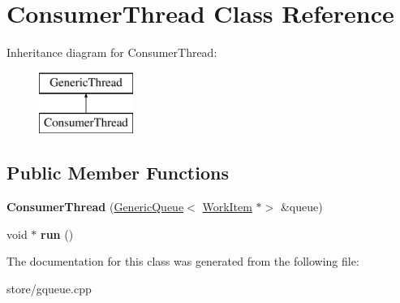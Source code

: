 \hypertarget{classConsumerThread}{}\section{Consumer\+Thread Class Reference}
\label{classConsumerThread}
Inheritance diagram for Consumer\+Thread\+:\begin{figure}[H]
\begin{center}
\leavevmode
\includegraphics[height=2.000000cm]{classConsumerThread}
\end{center}
\end{figure}
\subsection*{Public Member Functions}
\begin{DoxyCompactItemize}
\item 
{\bfseries Consumer\+Thread} (\hyperlink{classGenericQueue}{Generic\+Queue}$<$ \hyperlink{classWorkItem}{Work\+Item} $\ast$$>$ \&queue)\hypertarget{classConsumerThread_a58630b0d91cde906b27f6d20066055a1}{}\label{classConsumerThread_a58630b0d91cde906b27f6d20066055a1}

\item 
void $\ast$ {\bfseries run} ()\hypertarget{classConsumerThread_a8fde7a9b6c2c0b3c62a9fd3c50296557}{}\label{classConsumerThread_a8fde7a9b6c2c0b3c62a9fd3c50296557}

\end{DoxyCompactItemize}


The documentation for this class was generated from the following file\+:\begin{DoxyCompactItemize}
\item 
store/gqueue.\+cpp\end{DoxyCompactItemize}
